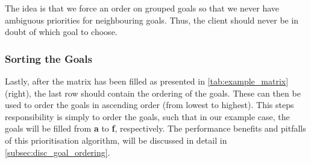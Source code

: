 The idea is that we force an order on grouped goals so that we never have ambiguous priorities for neighbouring goals.
Thus, the client should never be in doubt of which goal to choose.

\subsubsection{Sorting the Goals}
Lastly, after the matrix has been filled as presented in \cref{tab:example_matrix} (right), the last row should contain the ordering of the goals.
These can then be used to order the goals in ascending order (from lowest to highest).
This steps responsibility is simply to order the goals, such that in our example case, the goals will be filled from \textbf{a} to \textbf{f}, respectively.
The performance benefits and pitfalls of this prioritisation algorithm, will be discussed in detail in \cref{subsec:disc_goal_ordering}.
%





